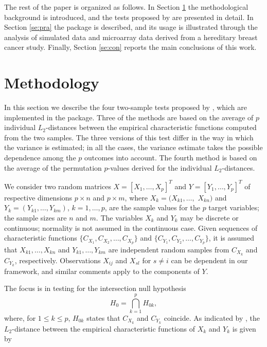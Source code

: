 The rest of the paper is organized as follows. In Section \ref{se:metho} the methodological background is
introduced, and the tests proposed by \cite{Marta2}
are presented in detail. In Section \ref{se:pra} the  package is described, and its usage is illustrated
through the analysis of simulated data and microarray data  derived from a hereditary breast cancer study. Finally, Section \ref{se:con} reports the main conclusions of this work.


\section{Methodology}\label{se:metho}

In this section we describe the four two-sample tests proposed by \cite{Marta2}, which are implemented in the  package. Three of the methods are based on the
average of $p$ individual $L_2$-distances between the empirical characteristic functions
computed from the two samples. The three versions of this test differ in the way in which the variance is estimated; in all the cases, the variance estimate takes the possible dependence among the $p$ outcomes into account. The fourth method is based on the average of the permutation $p$-values derived for the individual $L_2$-distances.


We consider two random matrices  $X=\left[X_1, \dots, 
X_p\right]^T$ and $Y=\left[Y_1, \dots, Y_p\right]^T$ of respective 
dimensions $p \times n$ and $p \times m$, where
$X_k=(X_{k1}, \dots,$ $X_{kn})$ and $Y_k=\left(Y_{k1}, \dots,
Y_{km}\right)$, $k=1, \dots,p$, are the sample values for the $p$ target variables; the sample sizes are $n$ and $m$. The variables $X_k$ and $Y_k$ may be discrete or continuous; normality is not assumed in the continuous case. Given sequences of characteristic functions $\{C_{X_1}, C_{X_2},\ldots, C_{X_p}\}$ and
$\{C_{Y_1}, C_{Y_2},\ldots, C_{Y_p}\}$, it is assumed that $X_{k1}, \dots, 
X_{kn}$ and $Y_{k1},\ldots,Y_{km}$ are independent random samples from
$C_{X_k}$ and $C_{Y_k}$, respectively. Observations 
$X_{ij}$ and $X_{sl}$ for $s\not =i$  can be dependent in our
framework, and similar comments apply to the components of
$Y$. 

The focus is in testing for the intersection null hypothesis  
$$ H_0= \bigcap_{k=1}^{p}  H_{0k},$$
where, for $1 \leq k \leq p$, $H_{0k}$ states that $C_{X_k}$ and $C_{Y_k}$ coincide. As indicated by \cite{Marta2}, the $L_2$-distance between the empirical characteristic functions of $X_k$ and $Y_k$ is given by

